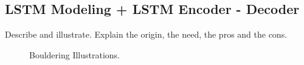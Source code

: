 \subsection{\textbf{LSTM Modeling + LSTM Encoder - Decoder}}
Describe and illustrate. Explain the origin, the need, the pros and the cons.
\begin{figure*}[h]
    \centering
    \caption{Bouldering Illustrations.}
\end{figure*}